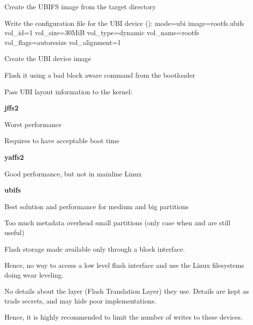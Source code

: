   \startitemize
  \item Create the UBIFS image from the target directory
  \item Write the configuration file for the UBI device ():
\small
{}
mode=ubi
image=rootfs.ubifs
vol_id=1
vol_size=30MiB
vol_type=dynamic
vol_name=rootfs
vol_flags=autoresize
vol_alignment=1
\stoptyping
  \item Create the UBI device image
  \item Flash it using a bad block aware command from the bootloader
  \item Pass UBI layout information to the kernel:
    \startitemize
    \item {}
    \stopitemize
  \stopitemize

  \startitemize
  \item {\bf jffs2}
    \startitemize
    \item Worst performance
    \item Requires  to have acceptable boot time
    \stopitemize
  \item {\bf yaffs2}
    \startitemize
    \item Good performance, but not in mainline Linux
    \stopitemize
  \item {\bf ubifs}
    \startitemize
    \item Best solution and performance for medium and big
      partitions
    \item Too much metadata overhead small partitions (only case
      when  and  are still useful)
    \stopitemize
  \stopitemize

  \startitemize
  \item Flash storage made available only through a block interface.
  \item Hence, no way to access a low level flash interface
    and use the Linux filesystems doing wear leveling.
  \item No details about the layer (Flash Translation Layer) they
    use. Details are kept as trade secrets, and may hide poor
    implementations.
  \item Hence, it is highly recommended to limit the number of writes
    to these devices.
  \stopitemize

